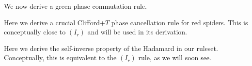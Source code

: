 \begin{primeircompactlemma}
\primeircompactproof
\par\noindent{}\par
\par\noindent{}\par
\tombstone
\end{primeircompactlemma}

We now derive a green phase commutation rule.

\begin{primeircompactlemma}
\primeircompactproof
\vspace{1.2cm}
\par\noindent{}\par
\tombstone
\end{primeircompactlemma}

Here we derive a crucial Clifford+\(T\) phase cancellation rule for red spiders. This is conceptually close to \hyperref[eq:prime-ir-Ir]{\((I_r)\)} and will be used in its derivation.

\begin{primeircompactlemma}
\primeircompactproof
\par\noindent{}\par
\par\noindent{}\par
{}
\tombstone
\end{primeircompactlemma}

Here we derive the self-inverse property of the Hadamard in our ruleset. Conceptually, this is equivalent to the \hyperref[eq:prime-ir-Ir]{\((I_r)\)} rule, as we will soon see.

